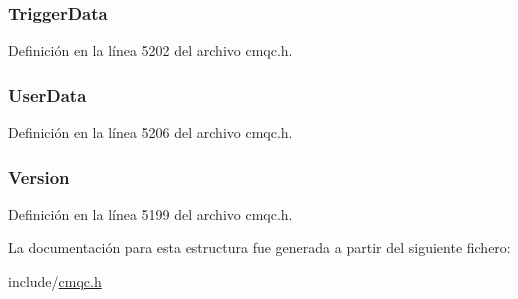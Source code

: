 \subsubsection[{Trigger\+Data}]{ Trigger\+Data}\label{structtag_m_q_t_m_c2_a172805e57851aa511b91533dd357ab99}


Definición en la línea 5202 del archivo cmqc.\+h.

\hypertarget{structtag_m_q_t_m_c2_a1a68f57af575a62cedaa18c391695747}{}
\subsubsection[{User\+Data}]{ User\+Data}\label{structtag_m_q_t_m_c2_a1a68f57af575a62cedaa18c391695747}


Definición en la línea 5206 del archivo cmqc.\+h.

\hypertarget{structtag_m_q_t_m_c2_ab6f4749c2f2c759dc2c8cf3bd2de5533}{}
\subsubsection[{Version}]{ Version}\label{structtag_m_q_t_m_c2_ab6f4749c2f2c759dc2c8cf3bd2de5533}


Definición en la línea 5199 del archivo cmqc.\+h.



La documentación para esta estructura fue generada a partir del siguiente fichero\+:\begin{DoxyCompactItemize}
\item 
include/\hyperlink{cmqc_8h}{cmqc.\+h}\end{DoxyCompactItemize}
